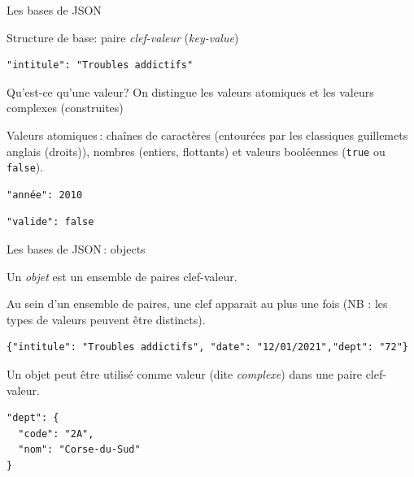 

\begin{frame}[fragile]{Les bases de JSON}

Structure de base: paire  \textit{clef-valeur} (\textit{key-value})

\begin{verbatim}
"intitule": "Troubles addictifs"
\end{verbatim}

\bigskip

\alert{Qu'est-ce qu'une valeur?} On distingue les
 valeurs \alert{atomiques} et les valeurs \alert{complexes} (construites)

\medskip
Valeurs atomiques\,: cha\^ines de caractères (entourées 
par les classiques guillemets anglais (droits)), nombres (entiers, flottants) 
et valeurs booléennes (\texttt{true} ou \texttt{false}).

\begin{verbatim}
"année": 2010
\end{verbatim}


\begin{verbatim}
"valide": false
\end{verbatim}


\end{frame}

\begin{frame}{Les bases de JSON\,: objects}

Un \textit{objet} est un ensemble de paires clef-valeur.

\vfill

Au sein d'un ensemble de paires, une clef apparait au plus une fois 
(NB : les types de valeurs peuvent être distincts).

\begin{verbatim}
{"intitule": "Troubles addictifs", "date": "12/01/2021","dept": "72"}
\end{verbatim}

\vfill

Un objet peut être utilisé comme valeur (dite \textit{complexe}) dans une paire clef-valeur.

\begin{verbatim}
"dept": {
  "code": "2A",
  "nom": "Corse-du-Sud"
}
\end{verbatim}


\end{frame}

